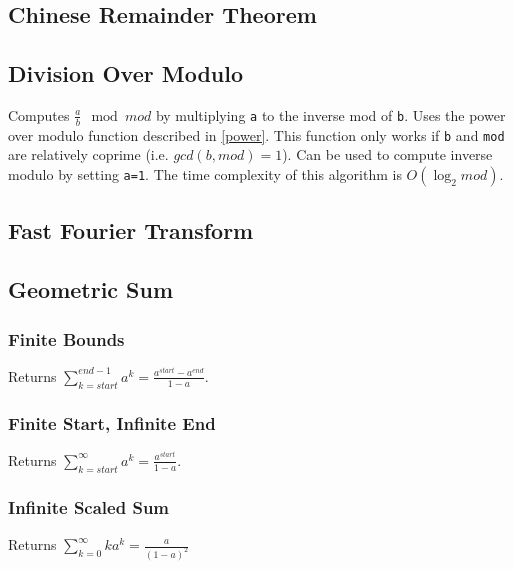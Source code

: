 \documentclass[letterpaper,11pt,twoside]{article}
\begin{document}
            \subsection{Chinese Remainder Theorem}
            \subsection{Division Over Modulo}
                Computes $\frac{a}{b} \mod mod$ by multiplying \verb|a| to the inverse mod of \verb|b|.
                Uses the power over modulo function described in \ref{power}.
                This function only works if \verb|b| and \verb|mod| are relatively coprime (i.e. $gcd(b,mod) = 1$).
                Can be used to compute inverse modulo by setting \verb|a=1|.
                The time complexity of this algorithm is $O(\log_2{mod})$.
                
                
            \subsection{Fast Fourier Transform}
            \subsection{Geometric Sum}
                \subsubsection{Finite Bounds}
                    Returns $\sum_{k=start}^{end-1}a^{k} = \frac{a^{start} - a^{end}}{1 - a}$.
                    
                    
                \subsubsection{Finite Start, Infinite End}
                    Returns $\sum_{k=start}^{\infty}a^{k} = \frac{a^{start}}{1 - a}$.
                    
                    
                \subsubsection{Infinite Scaled Sum}
                    Returns $\sum_{k=0}^{\infty}ka^{k} = \frac{a}{(1-a)^{2}}$
                    
                    
\end{document}
